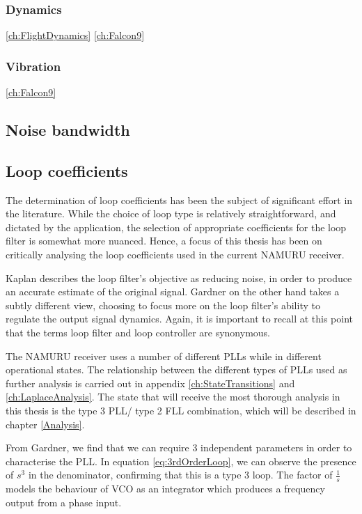 		\subsubsection{Dynamics}
		\ref{ch:FlightDynamics}
		\ref{ch:Falcon9}
		\subsubsection{Vibration}
		\ref{ch:Falcon9}
		
    \subsection{Noise bandwidth}
    
    
	\subsection{Loop coefficients}
	The determination of loop coefficients has been the subject of significant effort in the literature.  While the choice of loop type is relatively straightforward, and dictated by the application, the selection of appropriate coefficients for the loop filter is somewhat more nuanced. Hence, a focus of this thesis has been on critically analysing the loop coefficients used in the current \ac{NAMURU} receiver. 
	
	Kaplan describes the loop filter's objective as reducing noise, in order to produce an accurate estimate of the original signal\cite{Kaplan}. Gardner on the other hand takes a subtly different view, choosing to focus more on the loop filter's ability to regulate the output signal dynamics\cite{Gardner}. Again, it is important to recall at this point that the terms loop filter and loop controller are synonymous. 
	
	
	The \ac{NAMURU} receiver uses a number of different PLLs while in different operational states. The relationship between the different types of PLLs used as further analysis is carried out in appendix \ref{ch:StateTransitions} and \ref{ch:LaplaceAnalysis}. The state that will receive the most thorough analysis in this thesis is the type 3 PLL/ type 2 FLL combination, which will be described in chapter \ref{Analysis}. 
	
	
	From Gardner, we find that we can require 3 independent parameters in order to characterise the PLL\cite{Gardner}. In equation \ref{eq:3rdOrderLoop}, we can observe the presence of $s^3$ in the denominator, confirming that this is a type 3 loop. The factor of $\frac{1}{s}$ models the behaviour of \ac{VCO} as an integrator which produces a frequency output from a phase input. 
	
